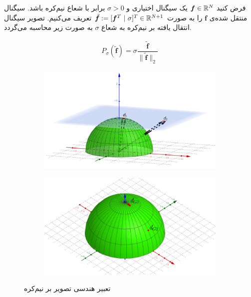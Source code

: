 \begin{definition}
\label{defn:HP}
فرض کنید
$ \bm{f}\in \mathbb{R}^{N} $
یک سیگنال اختیاری و
 $ \sigma >0 $
برابر با شعاع نیم‌کره باشد.
سیگنال منتقل شده‌ی
$ \bm{f} $
را به صورت
$ \tilde{\bm{f}}:= [\bm{f}^{T}~|~\sigma]^{T}\in \mathbb{R}^{N+1} $ 
تعریف می‌کنیم. تصویر سیگنال انتقال یافته بر نیم‌کره به شعاع
$\sigma$
 به صورت زیر محاسبه می‌گردد.

\begin{align}
\label{eq:eq29}
P_{\sigma}(\tilde{\bm{f}}) =\sigma \dfrac{\tilde{\bm{f}}}{\|\tilde{\bm{f}}\|_{2}}
\end{align}
\end{definition}

\begin{figure}[t]
	\centering
	\begin{subfigure}{0.4\textwidth} %
		\includegraphics[scale=0.2]{Images/ch3/fig13.png}
		\caption{} %
		\label{fig13}
	\end{subfigure}
	\vspace{1em} %
	\begin{subfigure}{0.4\textwidth} %
		\includegraphics[scale=0.2]{Images/ch3/fig14.png}
		\caption{} %
		\label{fig14}
	\end{subfigure}
	\caption{تعبیر هندسی تصویر بر نیم‌کره}
\end{figure}

